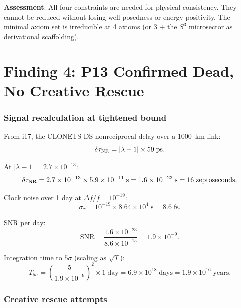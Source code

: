 \documentclass[11pt]{article}
\newcommand{\ee}[1]{\times 10^{#1}}
\newcommand{\lbone}{|\lambda - 1|}
\begin{document}
\textbf{Assessment}: All four constraints are needed for physical
consistency. They cannot be reduced without losing well-posedness
or energy positivity. The minimal axiom set is irreducible at 4
axioms (or 3 + the $S^3$ microsector as derivational scaffolding).


\part{Finding 4: P13 Confirmed Dead, No Creative Rescue}
\label{part:p13}

\section{Signal recalculation at tightened bound}

From i17, the CLONETS-DS nonreciprocal delay over a 1000~km link:
\begin{equation}
\delta\tau_{\rm NR} = \lbone \times 59\;\text{ps}.
\end{equation}

At $\lbone = 2.7\ee{-13}$:
\begin{equation}
\delta\tau_{\rm NR} = 2.7\ee{-13} \times 5.9\ee{-11}\;\text{s}
= 1.6\ee{-23}\;\text{s} = 16\;\text{zeptoseconds}.
\end{equation}

Clock noise over 1 day at $\Delta f/f = 10^{-19}$:
\begin{equation}
\sigma_\tau = 10^{-19} \times 8.64\ee{4}\;\text{s} = 8.6\;\text{fs}.
\end{equation}

SNR per day:
\begin{equation}
\text{SNR} = \frac{1.6\ee{-23}}{8.6\ee{-15}} = 1.9\ee{-9}.
\end{equation}

Integration time to $5\sigma$ (scaling as $\sqrt{T}$):
\begin{equation}
T_{5\sigma} = \left(\frac{5}{1.9\ee{-9}}\right)^2 \times 1\;\text{day}
= 6.9\ee{18}\;\text{days} = 1.9\ee{16}\;\text{years}.
\end{equation}

\section{Creative rescue attempts}
\end{document}
